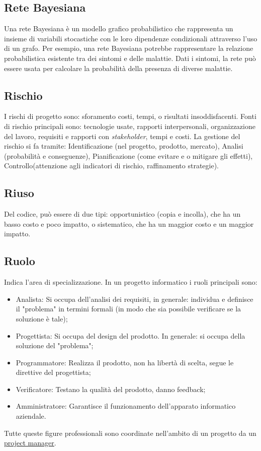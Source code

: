 	\subsection{Rete Bayesiana}
	Una rete Bayesiana è un modello grafico probabilistico che rappresenta un insieme di variabili stocastiche con le loro dipendenze condizionali attraverso l'uso di un grafo. Per esempio, una rete Bayesiana potrebbe rappresentare la relazione probabilistica esistente tra dei sintomi e delle malattie. Dati i sintomi, la rete può essere usata per calcolare la probabilità della presenza di diverse malattie.
	\label{sec:reteBayesiana}

	\subsection{Rischio}
	\label{sec:rischio}
	I rischi di progetto sono: sforamento costi, tempi, o risultati insoddisfacenti. Fonti di rischio principali sono:
	tecnologie usate, rapporti interpersonali, organizzazione del lavoro, requisiti e rapporti con  \emph{stakeholder}, tempi e costi.
	La gestione del rischio si fa tramite:
	Identificazione (nel progetto, prodotto, mercato), Analisi (probabilità e conseguenze), Pianificazione (come evitare e o mitigare gli effetti), Controllo(attenzione agli indicatori di rischio, raffinamento strategie).
	
	\subsection{Riuso}
	\label{sec:riuso}
	Del codice, può essere di due tipi: opportunistico (copia e incolla), che ha un basso costo e poco impatto, o sistematico, che ha un maggior costo e un maggior impatto.		

	\subsection{Ruolo}
	\label{sec:ruolo}
	Indica l'area di specializzazione.
	In un progetto informatico i ruoli principali sono:
	\begin{itemize}  
	\item Analista: Si occupa dell'analisi dei requisiti, in generale: individua e definisce il "problema" in termini formali (in modo che sia possibile verificare se la soluzione è tale);
	\item Progettista: Si occupa del design del prodotto. In generale: si occupa della soluzione del "problema";
	\item Programmatore: Realizza il prodotto, non ha libertà di scelta, segue le direttive del progettista;
	\item Verificatore: Testano la qualità del prodotto, danno feedback;
	\item Amministratore: Garantisce il funzionamento dell'apparato informatico aziendale. 
	\end{itemize}
	Tutte queste figure professionali sono coordinate nell'ambito di un progetto da un \underline{\hyperref[sec:projectmanager]{project manager}}.
	\newpage
	
